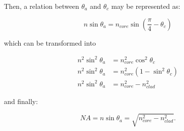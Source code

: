 Then, a relation between $\theta_a$ and $\theta_c$ may be represented as:

\begin{equation*}
    n\sin{\theta_a} = n_{core}\sin{\left(\frac{\pi}{4} - \theta_c\right)}
\end{equation*}

which can be transformed into

\begin{equation*}
\begin{split}
    n^2\sin^2{\theta_a} &= n^2_{core}\cos^2{\theta_c} \\
    n^2\sin^2{\theta_a} &= n^2_{core}\left(1 - \sin^2{\theta_c}\right) \\
    n^2\sin^2{\theta_a} &= n^2_{core} - n^2_{clad}
\end{split}
\end{equation*}

and finally:

\begin{equation}
    NA = n\sin{\theta_a} = \sqrt{n^2_{core} - n^2_{clad}}.
\end{equation}
